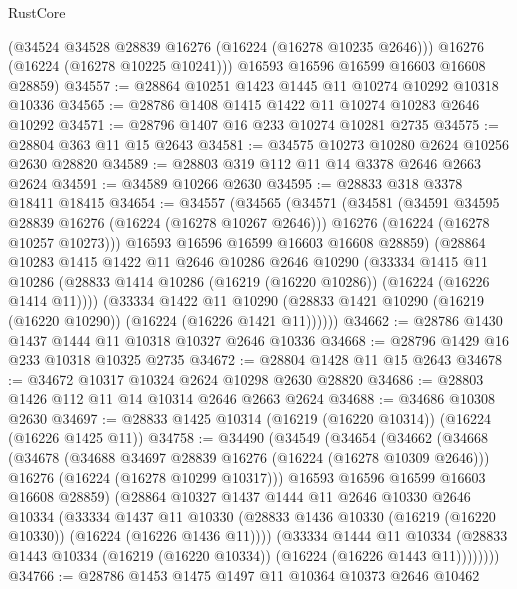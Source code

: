 \begin{lexlean}{RustCore}
\begin{coremodule}
        (@34524 @34528 @28839 @16276 (@16224 (@16278 @10235 @2646)))
        @16276
        (@16224 (@16278 @10225 @10241)))
      @16593
      @16596
      @16599
      @16603
      @16608
      @28859)
@34557 := @28864 @10251 @1423 @1445 @11 @10274 @10292 @10318 @10336
@34565 := @28786 @1408 @1415 @1422 @11 @10274 @10283 @2646 @10292
@34571 := @28796 @1407 @16 @233 @10274 @10281 @2735
@34575 := @28804 @363 @11 @15 @2643
@34581 := @34575 @10273 @10280 @2624 @10256 @2630 @28820
@34589 := @28803 @319 @112 @11 @14 @3378 @2646 @2663 @2624
@34591 := @34589 @10266 @2630
@34595 := @28833 @318 @3378 @18411 @18415
@34654 := @34557
    (@34565
      (@34571
        (@34581
          (@34591 @34595 @28839 @16276 (@16224 (@16278 @10267 @2646)))
          @16276
          (@16224 (@16278 @10257 @10273)))
        @16593
        @16596
        @16599
        @16603
        @16608
        @28859)
      (@28864
        @10283
        @1415
        @1422
        @11
        @2646
        @10286
        @2646
        @10290
        (@33334
          @1415
          @11
          @10286
          (@28833 @1414 @10286 (@16219 (@16220 @10286)) (@16224 (@16226 @1414 @11))))
        (@33334
          @1422
          @11
          @10290
          (@28833 @1421 @10290 (@16219 (@16220 @10290)) (@16224 (@16226 @1421 @11))))))
@34662 := @28786 @1430 @1437 @1444 @11 @10318 @10327 @2646 @10336
@34668 := @28796 @1429 @16 @233 @10318 @10325 @2735
@34672 := @28804 @1428 @11 @15 @2643
@34678 := @34672 @10317 @10324 @2624 @10298 @2630 @28820
@34686 := @28803 @1426 @112 @11 @14 @10314 @2646 @2663 @2624
@34688 := @34686 @10308 @2630
@34697 := @28833 @1425 @10314 (@16219 (@16220 @10314)) (@16224 (@16226 @1425 @11))
@34758 := @34490
    (@34549
      (@34654
        (@34662
          (@34668
            (@34678
              (@34688 @34697 @28839 @16276 (@16224 (@16278 @10309 @2646)))
              @16276
              (@16224 (@16278 @10299 @10317)))
            @16593
            @16596
            @16599
            @16603
            @16608
            @28859)
          (@28864
            @10327
            @1437
            @1444
            @11
            @2646
            @10330
            @2646
            @10334
            (@33334
              @1437
              @11
              @10330
              (@28833 @1436 @10330 (@16219 (@16220 @10330)) (@16224 (@16226 @1436 @11))))
            (@33334
              @1444
              @11
              @10334
              (@28833 @1443 @10334 (@16219 (@16220 @10334)) (@16224 (@16226 @1443 @11))))))))
@34766 := @28786 @1453 @1475 @1497 @11 @10364 @10373 @2646 @10462

\end{coremodule}
\end{lexlean}
